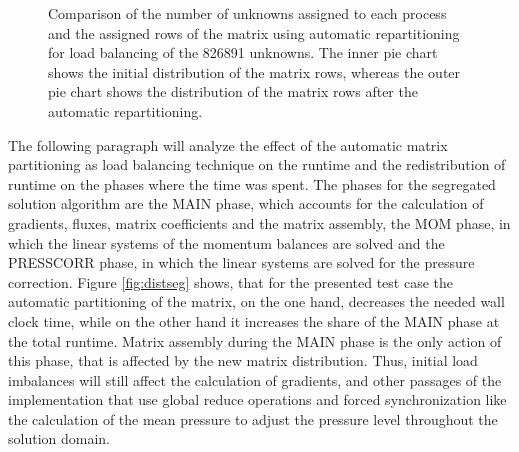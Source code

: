 \begin{figure}[h!]
\begin{minipage}{0.45\textwidth}
\end{minipage}
\caption{Comparison of the number of unknowns assigned to each process and the assigned rows of the matrix using automatic repartitioning for load balancing of the 826891 unknowns. The inner pie chart shows the initial distribution of the matrix rows, whereas the outer pie chart shows the distribution of the matrix rows after the automatic repartitioning.}
\label{fig:distcpld}
\end{figure}

The following paragraph will analyze the effect of the automatic matrix partitioning as load balancing technique on the runtime and the redistribution of runtime on the phases where the time was spent. The phases for the segregated solution algorithm are the MAIN phase, which accounts for the calculation of gradients, fluxes, matrix coefficients and the matrix assembly, the MOM phase, in which the linear systems of the momentum balances are solved and the PRESSCORR phase, in which the linear systems are solved for the pressure correction. Figure \ref{fig:distseg} shows, that for the presented test case the automatic partitioning of the matrix, on the one hand, decreases the needed wall clock time, while on the other hand it increases the share of the MAIN phase at the total runtime. Matrix assembly during the MAIN phase is the only action of this phase, that is affected by the new matrix distribution. Thus, initial load imbalances will still affect the calculation of gradients, and other passages of the implementation that use global reduce operations and forced synchronization like the calculation of the mean pressure to adjust the pressure level throughout the solution domain.

